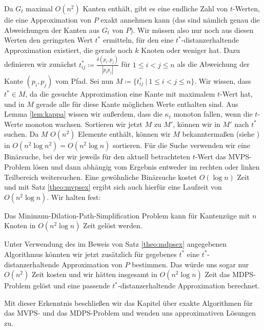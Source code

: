 	Da $G_t$ maximal $O(n^2)$ Kanten enthält, gibt es eine endliche Zahl von $t$-Werten, die eine Approximation von $P$ exakt annehmen kann (das sind nämlich genau die Abweichungen der Kanten aus $G_t$ von $P$). 
	Wir müssen also nur noch aus diesen Werten den geringsten Wert $t^*$ ermitteln, für den eine $t^*$-distanzerhaltende Approximation existiert, die gerade noch $k$ Knoten oder weniger hat. 
	Dazu definieren wir zunächst $t^*_{ij} \coloneqq\frac{\delta(p_i, p_j)}{|p_i p_j|}$ für $1\leq i < j \leq n$ als die Abweichung der Kante $(p_i, p_j)$ vom Pfad. 
	Sei nun $M\coloneqq\{t^*_{ij}\ |\ 1\leq i < j \leq n\}$. 
	Wir wissen, dass $t^* \in M$, da die gesuchte Approximation eine Kante mit maximalem $t$-Wert hat, und in $M$ gerade alle für diese Kante möglichen Werte enthalten sind. 
	Aus Lemma \ref{lem:kappa} wissen wir außerdem, dass die $\kappa_t$ monoton fallen, wenn die $t$-Werte monoton wachsen. 
	Sortieren wir jetzt $M$ zu $M'$, können wir in $M'$ nach $t^*$ suchen. Da $M$ $O(n^2)$ Elemente enthält, können wir $M$ bekanntermaßen (siehe \cite{hagerup}) in $O(n^2\log n^2)=O(n^2\log n)$ sortieren. 
	Für die Suche verwenden wir eine Binärsuche, bei der wir jeweils für den aktuell betrachteten $t$-Wert das MVPS-Problem lösen und dann abhängig vom Ergebnis entweder im rechten oder linken Teilbereich weitersuchen. 
	Eine gewöhnliche Binärsuche kostet $O(\log n)$ Zeit und mit Satz \ref{theo:mvpsex} ergibt sich auch hierfür eine Laufzeit von $O(n^2\log n)$. Wir halten fest:
	\begin{theorem}
		\label{theo:mdpsex}
		Das Minimum-Dilation-Path-Simplification Problem kann für Kantenzüge mit $n$ Knoten in $O(n^2 \log n)$ Zeit gelöst werden.
	\end{theorem}
	
	Unter Verwendung des im Beweis von Satz \ref{theo:mdpsex} angegebenen Algorithmus könnten wir jetzt zusätzlich für gegebenes $t^*$ eine $t^*$-distanzerhaltende Approximation von $P$ bestimmen. 
	Das würde uns sogar nur $O(n^2)$ Zeit kosten und wir hätten insgesamt in $O(n^2 \log n)$ Zeit das MDPS-Problem gelöst und eine passende $t^*$-distanzerhaltende Approximation berechnet.
	
	Mit dieser Erkenntnis beschließen wir das Kapitel über exakte Algorithmen für das MVPS- und das MDPS-Problem und wenden uns approximativen Lösungen zu.
